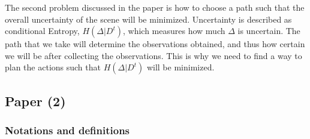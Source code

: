 \documentclass{article}
\begin{document}
	The second problem discussed in the paper is how to choose a path such that the overall uncertainty of the scene will be minimized.
	Uncertainty is described as conditional Entropy, $H(\Delta|D^t)$, which measures how much $\Delta$ is uncertain. The path that we take will determine the observations obtained, and thus how certain we will be after collecting the observations. This is why we need to find a way to plan the actions such that $H(\Delta|D^t)$ will be minimized.
	
	
	\subsection{Paper (2)}
	\subsubsection{Notations and definitions}
\end{document}

